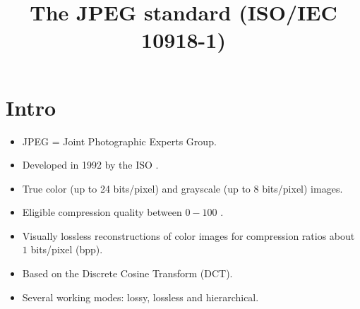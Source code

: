 \title{The JPEG standard (ISO/IEC 10918-1)}

\maketitle
\tableofcontents

\section{Intro}
\begin{itemize}
\item JPEG = Joint Photographic Experts Group.
\item Developed in 1992 by the ISO \cite{CCITT.T81}.
\item True color (up to 24 bits/pixel) and grayscale (up to 8
  bits/pixel) images.
\item Eligible compression quality between $0-100$ \cite{Wallace91}.
\item Visually lossless reconstructions of color images for
  compression ratios about $1$ bits/pixel (bpp).
\item Based on the Discrete Cosine Transform (DCT).
\item Several working modes: lossy, lossless and hierarchical.
\end{itemize}

